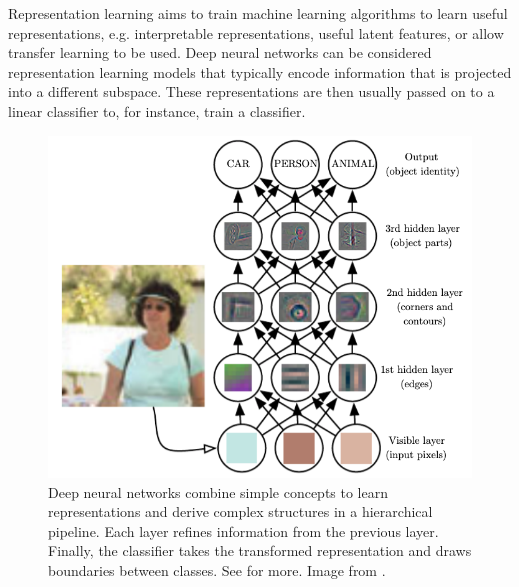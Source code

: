 Representation learning aims to train machine learning algorithms to learn useful representations, e.g. interpretable representations, useful latent features, or allow transfer learning to be used. 
Deep neural networks can be considered representation learning models that typically encode information that is projected into a different subspace. These representations are then usually passed on to a linear classifier to, for instance, train a classifier. 
\begin{figure}[h]
    \centering
    \includegraphics[scale=0.4]{chapters/assets/ssl_figs/ssl_rep_learning_images.png}
    \caption{Deep neural networks combine simple concepts to learn representations and derive complex structures in a hierarchical pipeline. Each layer refines  information from the previous layer. Finally, the  classifier takes the transformed representation and draws boundaries between classes. See  for more. Image from \parencite{GoodfellowDLBook2016}.}
    \label{fig:small-cnn-features}
\end{figure}

